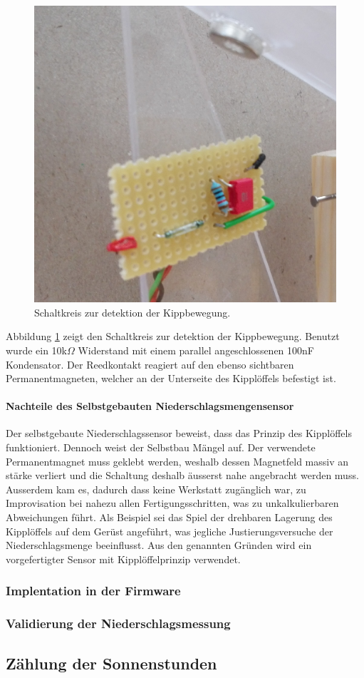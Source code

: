 \begin{figure}[h]
\centering
\includegraphics[width=0.4\linewidth]{graphics/KippSchalt.jpg}
\caption{Schaltkreis zur detektion der Kippbewegung.}
\label{fig:KippSchalt}
\end{figure}

Abbildung \ref{fig:KippSchalt} zeigt den Schaltkreis zur detektion der Kippbewegung. Benutzt wurde ein 10k$\Omega$ Widerstand mit einem parallel angeschlossenen 100nF Kondensator. Der Reedkontakt reagiert auf den ebenso sichtbaren Permanentmagneten, welcher an der Unterseite des Kipplöffels befestigt ist.

\paragraph{Nachteile des Selbstgebauten Niederschlagsmengensensor}
Der selbstgebaute Niederschlagssensor beweist, dass das Prinzip des Kipplöffels funktioniert. Dennoch weist der Selbstbau Mängel auf. Der verwendete Permanentmagnet muss geklebt werden, weshalb dessen Magnetfeld massiv an stärke verliert und die Schaltung deshalb äusserst nahe angebracht werden muss. Ausserdem kam es, dadurch dass keine Werkstatt zugänglich war, zu Improvisation bei nahezu allen Fertigungsschritten, was zu unkalkulierbaren Abweichungen führt. Als Beispiel sei das Spiel der drehbaren Lagerung des Kipplöffels auf dem Gerüst angeführt, was jegliche Justierungsversuche der Niederschlagsmenge beeinflusst. Aus den genannten Gründen wird ein vorgefertigter Sensor mit Kipplöffelprinzip verwendet.

\subsubsection*{Implentation in der Firmware}
\subsubsection*{Validierung der Niederschlagsmessung}

\newpage

\subsection{Zählung der Sonnenstunden}
